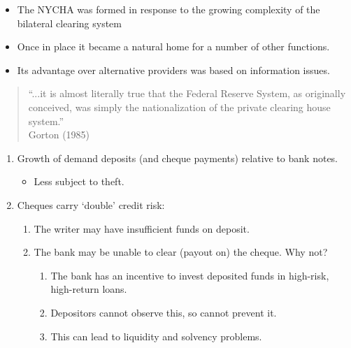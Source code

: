 \documentclass[20pt]{article}
\begin{document}
\begin{itemize}
    \item The NYCHA was formed in response to the growing complexity of the bilateral clearing system
    \item Once in place it became a natural home for a number of other functions.
    \item Its advantage over alternative providers was based on information issues.
\end{itemize}

\begin{quote} ``...it is almost literally true that the Federal Reserve System, as originally conceived, was simply the nationalization of the private clearing house system.'' \\ Gorton (1985)\end{quote}

\begin{screen}
\newpage
\end{screen}
\begin{enumerate}
    \item Growth of demand deposits (and cheque payments) relative to bank notes.
    \begin{itemize}
        \item Less subject to theft.
    \end{itemize}
    \item Cheques carry `double' credit risk:
    \begin{enumerate}
        \item The writer may have insufficient funds on deposit.
        \item The bank may be unable to clear (payout on) the cheque. Why not?
        \begin{enumerate}
            \item The bank has an incentive to invest deposited funds in high-risk, high-return loans.
            \item Depositors cannot observe this, so cannot prevent it.
            \item This can lead to liquidity and solvency problems.
        \end{enumerate}
    \end{enumerate}
\end{enumerate}

\end{document}
